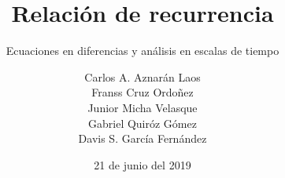 \documentclass[
	graybox,
	envcountchap,
	sectrefs
]{svmono}
\date{21 de junio del 2019}
\begin{document}
\hypersetup{pageanchor=false}

\author{
	Carlos A. Aznarán Laos\\
	Franss Cruz Ordoñez\\
	Junior Micha Velasque\\
	Gabriel Quiróz Gómez\\
	Davis S. García Fernández
}
\title{Relación de recurrencia}
\subtitle{Ecuaciones en diferencias y análisis en escalas de tiempo}
\maketitle

\frontmatter

%



\tableofcontents

%

\hypersetup{pageanchor=true}

\mainmatter

\begingroup
\let\clearpage\relax







%
\endgroup
%
\begingroup
\let\clearpage\relax
%
\endgroup
%
\begingroup
\let\clearpage\relax
%
%
%
\endgroup

\backmatter
%
%
%
\printindex
\end{document}
